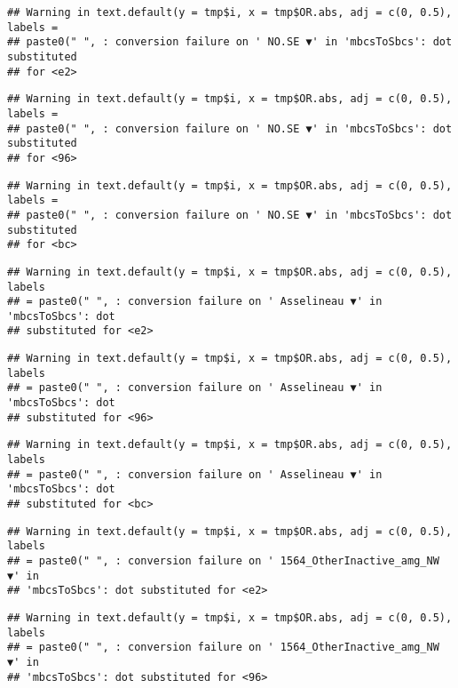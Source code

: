 \documentclass[
]{article}
\begin{document}
\begin{verbatim}
## Warning in text.default(y = tmp$i, x = tmp$OR.abs, adj = c(0, 0.5), labels =
## paste0(" ", : conversion failure on ' NO.SE ▼' in 'mbcsToSbcs': dot substituted
## for <e2>
\end{verbatim}

\begin{verbatim}
## Warning in text.default(y = tmp$i, x = tmp$OR.abs, adj = c(0, 0.5), labels =
## paste0(" ", : conversion failure on ' NO.SE ▼' in 'mbcsToSbcs': dot substituted
## for <96>
\end{verbatim}

\begin{verbatim}
## Warning in text.default(y = tmp$i, x = tmp$OR.abs, adj = c(0, 0.5), labels =
## paste0(" ", : conversion failure on ' NO.SE ▼' in 'mbcsToSbcs': dot substituted
## for <bc>
\end{verbatim}

\begin{verbatim}
## Warning in text.default(y = tmp$i, x = tmp$OR.abs, adj = c(0, 0.5), labels
## = paste0(" ", : conversion failure on ' Asselineau ▼' in 'mbcsToSbcs': dot
## substituted for <e2>
\end{verbatim}

\begin{verbatim}
## Warning in text.default(y = tmp$i, x = tmp$OR.abs, adj = c(0, 0.5), labels
## = paste0(" ", : conversion failure on ' Asselineau ▼' in 'mbcsToSbcs': dot
## substituted for <96>
\end{verbatim}

\begin{verbatim}
## Warning in text.default(y = tmp$i, x = tmp$OR.abs, adj = c(0, 0.5), labels
## = paste0(" ", : conversion failure on ' Asselineau ▼' in 'mbcsToSbcs': dot
## substituted for <bc>
\end{verbatim}

\begin{verbatim}
## Warning in text.default(y = tmp$i, x = tmp$OR.abs, adj = c(0, 0.5), labels
## = paste0(" ", : conversion failure on ' 1564_OtherInactive_amg_NW ▼' in
## 'mbcsToSbcs': dot substituted for <e2>
\end{verbatim}

\begin{verbatim}
## Warning in text.default(y = tmp$i, x = tmp$OR.abs, adj = c(0, 0.5), labels
## = paste0(" ", : conversion failure on ' 1564_OtherInactive_amg_NW ▼' in
## 'mbcsToSbcs': dot substituted for <96>
\end{verbatim}
\end{document}
